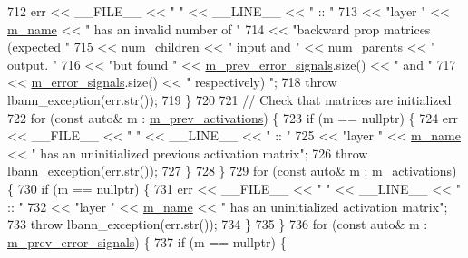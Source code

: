 \begin{DoxyCode}
712     err << \_\_FILE\_\_ << \textcolor{stringliteral}{" "} << \_\_LINE\_\_ << \textcolor{stringliteral}{" :: "}
713         << \textcolor{stringliteral}{"layer "} << \hyperlink{classlbann_1_1Layer_aa47109ad09b399142fa92f9d3702189f}{m\_name} << \textcolor{stringliteral}{" has an invalid number of "}
714         << \textcolor{stringliteral}{"backward prop matrices (expected "}
715         << num\_children << \textcolor{stringliteral}{" input and "} << num\_parents << \textcolor{stringliteral}{" output. "}
716         << \textcolor{stringliteral}{"but found "} << \hyperlink{classlbann_1_1Layer_a6fdcbf884150d0b20cffe678fefd7caa}{m\_prev\_error\_signals}.size() << \textcolor{stringliteral}{" and "}
717         << \hyperlink{classlbann_1_1Layer_a452e22ac81c1a799f0614b3e942ea726}{m\_error\_signals}.size() << \textcolor{stringliteral}{" respectively) "};
718     \textcolor{keywordflow}{throw} lbann\_exception(err.str());
719   \}
720 
721   \textcolor{comment}{// Check that matrices are initialized}
722   \textcolor{keywordflow}{for} (\textcolor{keyword}{const} \textcolor{keyword}{auto}& m : \hyperlink{classlbann_1_1Layer_a52314601c3458268f56e017dc2ade357}{m\_prev\_activations}) \{
723     \textcolor{keywordflow}{if} (m == \textcolor{keyword}{nullptr}) \{
724       err << \_\_FILE\_\_ << \textcolor{stringliteral}{" "} << \_\_LINE\_\_ << \textcolor{stringliteral}{" :: "}
725           << \textcolor{stringliteral}{"layer "} << \hyperlink{classlbann_1_1Layer_aa47109ad09b399142fa92f9d3702189f}{m\_name} << \textcolor{stringliteral}{" has an uninitialized previous activation matrix"};
726       \textcolor{keywordflow}{throw} lbann\_exception(err.str());
727     \}
728   \}
729   \textcolor{keywordflow}{for} (\textcolor{keyword}{const} \textcolor{keyword}{auto}& m : \hyperlink{classlbann_1_1Layer_a7caf08e938141d1584e6939cefa4baed}{m\_activations}) \{
730     \textcolor{keywordflow}{if} (m == \textcolor{keyword}{nullptr}) \{
731       err << \_\_FILE\_\_ << \textcolor{stringliteral}{" "} << \_\_LINE\_\_ << \textcolor{stringliteral}{" :: "}
732           << \textcolor{stringliteral}{"layer "} << \hyperlink{classlbann_1_1Layer_aa47109ad09b399142fa92f9d3702189f}{m\_name} << \textcolor{stringliteral}{" has an uninitialized activation matrix"};
733       \textcolor{keywordflow}{throw} lbann\_exception(err.str());
734     \}
735   \}
736   \textcolor{keywordflow}{for} (\textcolor{keyword}{const} \textcolor{keyword}{auto}& m : \hyperlink{classlbann_1_1Layer_a6fdcbf884150d0b20cffe678fefd7caa}{m\_prev\_error\_signals}) \{
737     \textcolor{keywordflow}{if} (m == \textcolor{keyword}{nullptr}) \{

\end{DoxyCode}
